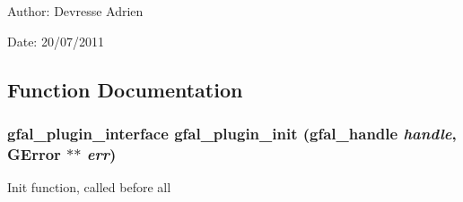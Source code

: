 \begin{Desc}
\item[Author:]Devresse Adrien \end{Desc}
\begin{Desc}
\item[Date:]20/07/2011 \end{Desc}


\subsection{Function Documentation}
\subsubsection{\setlength{\rightskip}{0pt plus 5cm}\bf{gfal\_\-plugin\_\-interface} gfal\_\-plugin\_\-init (gfal\_\-handle {\em handle}, GError $\ast$$\ast$ {\em err})}\label{gfal__dcap__plugin__main_8h_0d53404e0e873535bffdfb3197bb73af}


Init function, called before all 